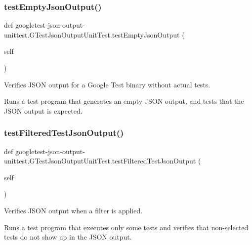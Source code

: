 \subsubsection{\texorpdfstring{testEmptyJsonOutput()}{testEmptyJsonOutput()}}
{\footnotesize\ttfamily def googletest-\/json-\/output-\/unittest.\+G\+Test\+Json\+Output\+Unit\+Test.\+test\+Empty\+Json\+Output (\begin{DoxyParamCaption}\item[{}]{self }\end{DoxyParamCaption})}

\begin{DoxyVerb}Verifies JSON output for a Google Test binary without actual tests.

Runs a test program that generates an empty JSON output, and
tests that the JSON output is expected.
\end{DoxyVerb}
 \mbox{\label{classgoogletest-json-output-unittest_1_1GTestJsonOutputUnitTest_abc55ae0ca4d9b3d265b10bbbcc6e720e}} 
\subsubsection{\texorpdfstring{testFilteredTestJsonOutput()}{testFilteredTestJsonOutput()}}
{\footnotesize\ttfamily def googletest-\/json-\/output-\/unittest.\+G\+Test\+Json\+Output\+Unit\+Test.\+test\+Filtered\+Test\+Json\+Output (\begin{DoxyParamCaption}\item[{}]{self }\end{DoxyParamCaption})}

\begin{DoxyVerb}Verifies JSON output when a filter is applied.

Runs a test program that executes only some tests and verifies that
non-selected tests do not show up in the JSON output.
\end{DoxyVerb}
 \mbox{\label{classgoogletest-json-output-unittest_1_1GTestJsonOutputUnitTest_ab5520f22133356e62a54cdb5756504bc}} 
